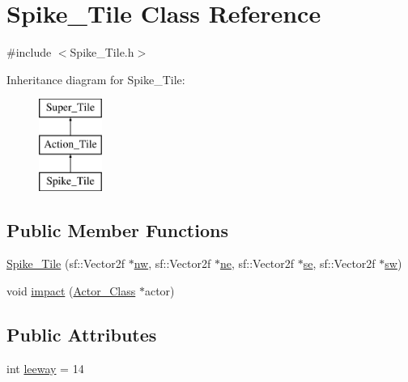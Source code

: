 \hypertarget{class_spike___tile}{}\section{Spike\+\_\+\+Tile Class Reference}
\label{class_spike___tile}


{\ttfamily \#include $<$Spike\+\_\+\+Tile.\+h$>$}

Inheritance diagram for Spike\+\_\+\+Tile\+:\begin{figure}[H]
\begin{center}
\leavevmode
\includegraphics[height=3.000000cm]{class_spike___tile}
\end{center}
\end{figure}
\subsection*{Public Member Functions}
\begin{DoxyCompactItemize}
\item 
\hyperlink{class_spike___tile_a7752370ac92d839421a0405965fec127}{Spike\+\_\+\+Tile} (sf\+::\+Vector2f $\ast$\hyperlink{class_super___tile_ad6bcea1fd54f67808f54ba2aacd88596}{nw}, sf\+::\+Vector2f $\ast$\hyperlink{class_super___tile_a55f6d2860da36f13019bd4e0d18364ca}{ne}, sf\+::\+Vector2f $\ast$\hyperlink{class_super___tile_ab384b89a7a631b8b75c4d405c51a23e1}{se}, sf\+::\+Vector2f $\ast$\hyperlink{class_super___tile_abe9efe0c3d1ed440395225843435dfc8}{sw})
\item 
void \hyperlink{class_spike___tile_a8673c82f84733fe73c456eee725a6ab0}{impact} (\hyperlink{class_actor___class}{Actor\+\_\+\+Class} $\ast$actor)
\end{DoxyCompactItemize}
\subsection*{Public Attributes}
\begin{DoxyCompactItemize}
\item 
int \hyperlink{class_spike___tile_af294383b8e83dfd6cfbc72b73174f8df}{leeway} = 14
\end{DoxyCompactItemize}


